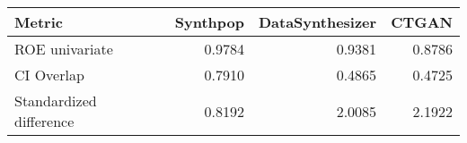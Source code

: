 \begin{tabular}{lrrr}
  \toprule
Metric & Synthpop & DataSynthesizer & CTGAN \\ 
  \midrule
\medskip ROE univariate & 0.9784 & 0.9381 & 0.8786 \\ 
  CI Overlap & 0.7910 & 0.4865 & 0.4725 \\ 
  Standardized difference & 0.8192 & 2.0085 & 2.1922 \\ 
   \bottomrule
\end{tabular}
